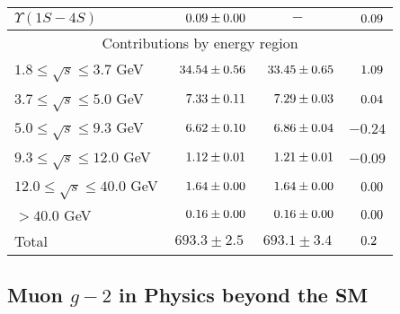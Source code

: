 \begin{table*}
\begin{center}
\begin{tabular}{|l|c|c|c|}
$\Upsilon(1S-4S)$& $\hpzz0.09 \pm 0.00$  & $-$ & $\hph0.09$ \\
\hline 
\multicolumn{4}{|c|}{Contributions by energy region} \\
\hline
  $1.8 \leq \sqrt{s} \leq 3.7$ GeV
       & $\hpz34.54 \pm 0.56$  & $\hpz33.45 \pm 0.65$ & $\hph1.09$\\
  $3.7 \leq \sqrt{s} \leq 5.0$ GeV
       & $\hpzz7.33 \pm 0.11$  & $\hpzz7.29 \pm 0.03$ & $\hph0.04$\\
  $5.0 \leq \sqrt{s} \leq 9.3$ GeV
       & $\hpzz6.62 \pm 0.10$  & $\hpzz6.86 \pm 0.04$ & $-0.24$\\
  $9.3 \leq \sqrt{s} \leq 12.0$ GeV
       & $\hpzz1.12 \pm 0.01$  & $\hpzz1.21 \pm 0.01$ & $-0.09$\\
  $12.0 \leq \sqrt{s} \leq 40.0$ GeV
       & $\hpzz1.64 \pm 0.00$  & $\hpzz1.64 \pm 0.00$ & $\hph0.00$\\
  $> 40.0$ GeV
       & $\hpzz0.16 \pm 0.00$  & $\hpzz0.16 \pm 0.00$ & $\hph0.00$\\
\hline\hline
Total  &     $693.3 \pm 2.5$   &     $693.1 \pm 3.4$  & $\hph0.2\hpz$ \\
\hline
\end{tabular} \end{center} \end{table*}

\subsection{Muon $g-2$ in Physics beyond the SM}

